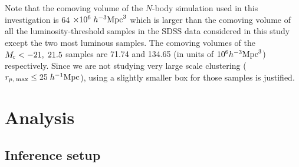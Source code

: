 \documentclass[12pt, preprint]{aastex}
\begin{document}
Note that the comoving volume of the $N$-body simulation used in this investigation is 64 $\times 10^{6} \; h^{-3}\rm{Mpc}^{3}$ which is larger than the comoving volume of all the luminosity-threshold samples in the SDSS data considered in this study except the two most luminous samples. The comoving volumes of the $M_{\rm r}<-21, \; 21.5$ samples are 71.74 and 134.65 (in units of $10^{6} h^{-3}\rm{Mpc}^{3}$) respectively. Since we are not studying very large scale clustering ($r_{p,\; \rm max} \leq 25 \; h^{-1}\rm{Mpc}$), using a slightly smaller box for those samples is justified. 

\section{Analysis}\label{sec:analysis}

\subsection{Inference setup}\label{subsec:analysis}
\end{document}
